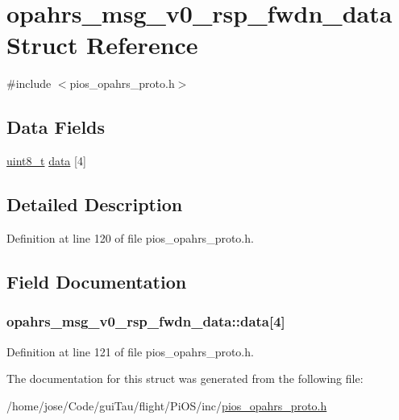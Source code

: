 \hypertarget{structopahrs__msg__v0__rsp__fwdn__data}{\section{opahrs\-\_\-msg\-\_\-v0\-\_\-rsp\-\_\-fwdn\-\_\-data Struct Reference}
\label{structopahrs__msg__v0__rsp__fwdn__data}
}


{\ttfamily \#include $<$pios\-\_\-opahrs\-\_\-proto.\-h$>$}

\subsection*{Data Fields}
\begin{DoxyCompactItemize}
\item 
\hyperlink{stdint_8h_aba7bc1797add20fe3efdf37ced1182c5}{uint8\-\_\-t} \hyperlink{structopahrs__msg__v0__rsp__fwdn__data_a9dfd9ebee717a5577513ef5ace337072}{data} \mbox{[}4\mbox{]}
\end{DoxyCompactItemize}


\subsection{Detailed Description}


Definition at line 120 of file pios\-\_\-opahrs\-\_\-proto.\-h.



\subsection{Field Documentation}
\hypertarget{structopahrs__msg__v0__rsp__fwdn__data_a9dfd9ebee717a5577513ef5ace337072}{
\subsubsection[{data}]{ opahrs\-\_\-msg\-\_\-v0\-\_\-rsp\-\_\-fwdn\-\_\-data\-::data\mbox{[}4\mbox{]}}}\label{structopahrs__msg__v0__rsp__fwdn__data_a9dfd9ebee717a5577513ef5ace337072}


Definition at line 121 of file pios\-\_\-opahrs\-\_\-proto.\-h.



The documentation for this struct was generated from the following file\-:\begin{DoxyCompactItemize}
\item 
/home/jose/\-Code/gui\-Tau/flight/\-Pi\-O\-S/inc/\hyperlink{pios__opahrs__proto_8h}{pios\-\_\-opahrs\-\_\-proto.\-h}\end{DoxyCompactItemize}
